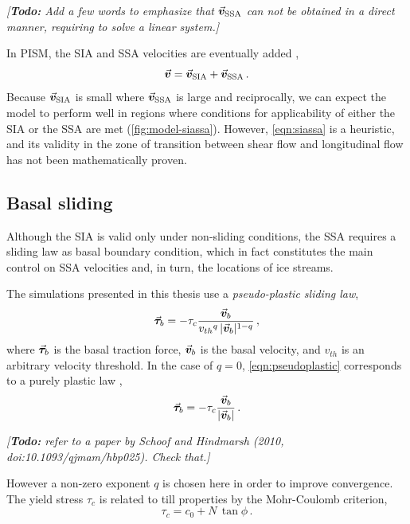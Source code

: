 \documentclass{article}
\newcommand{\todo}[1]{\emph{[\textbf{Todo:} #1]}}
\newcommand{\vect}[1]{\va*{#1}} %
\newcommand{\vv}[0]{\vect{v}}           %
\newcommand{\vsia}[0]{\vv_{\mathrm{SIA}}}   %
\newcommand{\vssa}[0]{\vv_{\mathrm{SSA}}}   %
\begin{document}
\todo{Add a few words to emphasize that $\vssa$ can not be obtained in a
      direct manner, requiring to solve a linear system.}

In PISM, the SIA and SSA velocities are eventually added
\citep[Eq.~15]{Winkelmann.etal.2011},
\begin{equation}
    \label{eqn:siassa}
    \vv = \vsia + \vssa \,.
\end{equation}
Because $\vsia$ is small where $\vssa$ is large and
reciprocally, we can expect the model to perform well in regions where
conditions for applicability of either the SIA or the SSA are met
(\cref{fig:model-siassa}). However,
\cref{eqn:siassa} is a heuristic, and its validity in the zone of
transition between shear flow and longitudinal flow has not been
mathematically proven.


\subsection{Basal sliding}

Although the SIA is valid only under non-sliding conditions, the SSA requires
a sliding law as basal boundary condition, which in fact constitutes the main
control on SSA velocities and, in turn, the locations of ice streams.

The simulations presented in this thesis use a \emph{pseudo-plastic sliding
law},
\begin{equation}
    \label{eqn:pseudoplastic}
    \vect{\tau}_b = -\tau_c \frac{\vv_b}{{v_{th}}^q\,|\vv_b|^{1-q}} \,,
\end{equation}
where $\vect{\tau}_b$ is the basal traction force, $\vv_b$ is the basal
velocity, and $v_{th}$ is an arbitrary velocity threshold. In the case of
$q=0$, \cref{eqn:pseudoplastic} corresponds to a purely plastic law
\citep[Eq.~11]{Winkelmann.etal.2011},
\begin{equation}
    \label{eqn:plastic}
    \vect{\tau}_b = -\tau_c \frac{\vv_b}{|\vv_b|} \,.
\end{equation}

\todo{\citep[supplement]{Aschwanden.etal.2013} refer to a paper by Schoof and
      Hindmarsh (2010, doi:10.1093/qjmam/hbp025). Check that.}

However a non-zero exponent $q$ is chosen here in order to improve convergence.
The yield stress $\tau_c$ is related to till properties by the Mohr-Coulomb
criterion,
\begin{equation}
   \tau_c = c_0 + N\,\tan{\phi} \,.
\end{equation}
\end{document}
